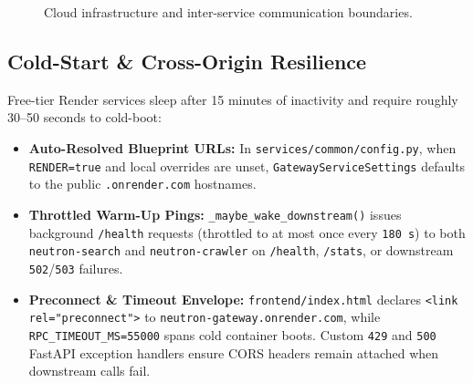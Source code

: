 \documentclass[10pt,a4paper]{article}
\begin{document}
\begin{figure}[H]
{}
\caption{Cloud infrastructure and inter-service communication boundaries.}
\label{fig:cloud-arch}
\end{figure}

\subsection{Cold-Start \& Cross-Origin Resilience}
Free-tier Render services sleep after 15 minutes of inactivity and require roughly 30--50 seconds to cold-boot:
\begin{itemize}[leftmargin=1.4em, itemsep=2pt]
    \item \textbf{Auto-Resolved Blueprint URLs:} In \texttt{services/common/config.py}, when \texttt{RENDER=true} and local overrides are unset, \texttt{GatewayServiceSettings} defaults to the public \texttt{.onrender.com} hostnames.
    \item \textbf{Throttled Warm-Up Pings:} \texttt{\_maybe\_wake\_downstream()} issues background \texttt{/health} requests (throttled to at most once every \texttt{180\,s}) to both \texttt{neutron-search} and \texttt{neutron-crawler} on \texttt{/health}, \texttt{/stats}, or downstream \texttt{502}/\texttt{503} failures.
    \item \textbf{Preconnect \& Timeout Envelope:} \texttt{frontend/index.html} declares \texttt{<link rel="preconnect">} to \texttt{neutron-gateway.onrender.com}, while \texttt{RPC\_TIMEOUT\_MS=55000} spans cold container boots. Custom \texttt{429} and \texttt{500} FastAPI exception handlers ensure CORS headers remain attached when downstream calls fail.
\end{itemize}
\end{document}
